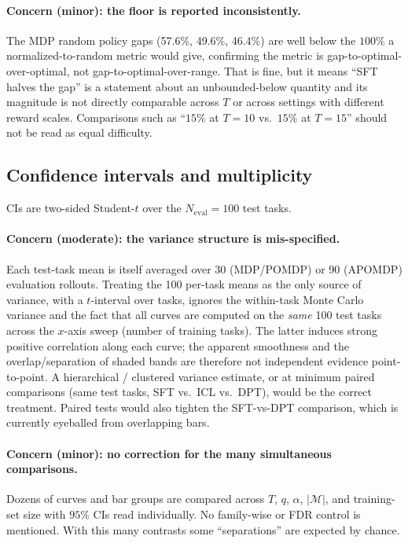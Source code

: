 \documentclass[11pt]{article}
\begin{document}
\paragraph{Concern (minor): the floor is reported inconsistently.} The MDP random policy gaps
(57.6\%, 49.6\%, 46.4\%) are well below the $100\%$ a normalized-to-random metric would give,
confirming the metric is gap-to-optimal-over-optimal, not gap-to-optimal-over-range. That is
fine, but it means ``SFT halves the gap'' is a statement about an unbounded-below quantity and
its magnitude is not directly comparable across $T$ or across settings with different reward
scales. Comparisons such as ``$15\%$ at $T=10$ vs.\ $15\%$ at $T=15$'' should not be read as
equal difficulty.

\subsection{Confidence intervals and multiplicity}

CIs are two-sided Student-$t$ over the $N_{\mathrm{eval}}=100$ test tasks.

\paragraph{Concern (moderate): the variance structure is mis-specified.} Each test-task mean
is itself averaged over 30 (MDP/POMDP) or 90 (APOMDP) evaluation rollouts. Treating the 100
per-task means as the only source of variance, with a $t$-interval over tasks, ignores the
within-task Monte Carlo variance and the fact that all curves are computed on the \emph{same}
100 test tasks across the $x$-axis sweep (number of training tasks). The latter induces strong
positive correlation along each curve; the apparent smoothness and the overlap/separation of
shaded bands are therefore not independent evidence point-to-point. A hierarchical / clustered
variance estimate, or at minimum paired comparisons (same test tasks, SFT vs.\ ICL vs.\ DPT),
would be the correct treatment. Paired tests would also tighten the SFT-vs-DPT comparison,
which is currently eyeballed from overlapping bars.

\paragraph{Concern (minor): no correction for the many simultaneous comparisons.} Dozens of
curves and bar groups are compared across $T$, $q$, $\alpha$, $|\mathcal{M}|$, and training-set
size with $95\%$ CIs read individually. No family-wise or FDR control is mentioned. With this
many contrasts some ``separations'' are expected by chance.
\end{document}
